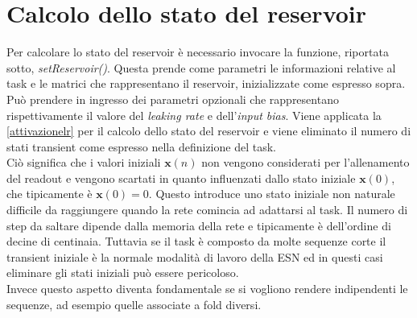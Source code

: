 \section{Calcolo dello stato del reservoir}
Per calcolare lo stato del reservoir è necessario invocare la funzione, riportata sotto, \textit{setReservoir()}. Questa prende come parametri le informazioni relative al task e le matrici che rappresentano il reservoir, inizializzate come espresso sopra.
Può prendere in ingresso dei parametri opzionali che rappresentano rispettivamente il valore del \textit{leaking rate} e dell'\textit{input bias}. Viene applicata la \ref{attivazionelr} per il calcolo dello stato del reservoir e viene eliminato il numero di stati transient  come espresso nella definizione del task.\\
Ciò significa che i valori iniziali $\mathbf{x}(n)$ non vengono considerati per l'allenamento del readout e vengono scartati in quanto influenzati dallo stato iniziale $\mathbf{x}(0)$, che tipicamente è $\mathbf{x}(0)=0$. Questo introduce uno stato iniziale non naturale difficile da raggiungere quando la rete comincia ad adattarsi al task. Il numero di step da saltare dipende dalla memoria della rete e tipicamente è dell'ordine di decine di centinaia. Tuttavia se il task è composto da molte sequenze corte il transient iniziale è la normale modalità di lavoro della ESN ed in questi casi eliminare gli stati iniziali può essere pericoloso.\\
Invece questo aspetto diventa fondamentale se si vogliono rendere indipendenti le sequenze, ad esempio quelle associate a fold diversi.



